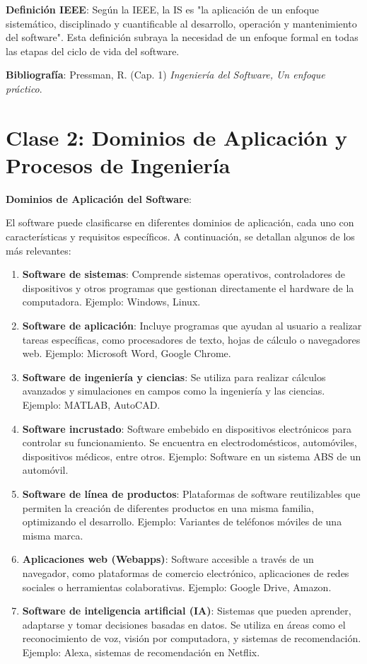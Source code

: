 \documentclass[a4paper,11pt]{article}
\begin{document}
\textbf{Definición IEEE}: Según la IEEE, la IS es "la aplicación de un enfoque sistemático, disciplinado y cuantificable al desarrollo, operación y mantenimiento del software". Esta definición subraya la necesidad de un enfoque formal en todas las etapas del ciclo de vida del software.

\textbf{Bibliografía}: Pressman, R. (Cap. 1) \textit{Ingeniería del Software, Un enfoque práctico}.

\newpage

\section*{Clase 2: Dominios de Aplicación y Procesos de Ingeniería}

\textbf{Dominios de Aplicación del Software}:

El software puede clasificarse en diferentes dominios de aplicación, cada uno con características y requisitos específicos. A continuación, se detallan algunos de los más relevantes:

\begin{enumerate}[label=\arabic*.]

    \item \textbf{Software de sistemas}: Comprende sistemas operativos, controladores de dispositivos y otros programas que gestionan directamente el hardware de la computadora. Ejemplo: Windows, Linux.
    \item \textbf{Software de aplicación}: Incluye programas que ayudan al usuario a realizar tareas específicas, como procesadores de texto, hojas de cálculo o navegadores web. Ejemplo: Microsoft Word, Google Chrome.
    \item \textbf{Software de ingeniería y ciencias}: Se utiliza para realizar cálculos avanzados y simulaciones en campos como la ingeniería y las ciencias. Ejemplo: MATLAB, AutoCAD.
    \item \textbf{Software incrustado}: Software embebido en dispositivos electrónicos para controlar su funcionamiento. Se encuentra en electrodomésticos, automóviles, dispositivos médicos, entre otros. Ejemplo: Software en un sistema ABS de un automóvil.
    \item \textbf{Software de línea de productos}: Plataformas de software reutilizables que permiten la creación de diferentes productos en una misma familia, optimizando el desarrollo. Ejemplo: Variantes de teléfonos móviles de una misma marca.
    \item \textbf{Aplicaciones web (Webapps)}: Software accesible a través de un navegador, como plataformas de comercio electrónico, aplicaciones de redes sociales o herramientas colaborativas. Ejemplo: Google Drive, Amazon.
    \item \textbf{Software de inteligencia artificial (IA)}: Sistemas que pueden aprender, adaptarse y tomar decisiones basadas en datos. Se utiliza en áreas como el reconocimiento de voz, visión por computadora, y sistemas de recomendación. Ejemplo: Alexa, sistemas de recomendación en Netflix.

\end{enumerate}
\end{document}
